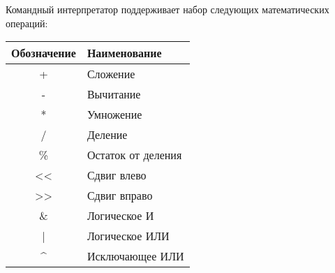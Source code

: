 Командный интерпретатор поддерживает набор следующих математических операций:

\begin{center}
	\begin{tabular}{c|l}
		\textbf{Обозначение} & \textbf{Наименование} \\
		\hline
		+ 	& 	Сложение \\
		\hline
		- 	& 	Вычитание \\
		\hline
		* 	& 	Умножение \\
		\hline
		/ 	& 	Деление \\
		\hline
		\% 	& 	Остаток от деления \\
		\hline
		<{<} 	& 	Сдвиг влево \\
		\hline
		>{>} 	& 	Сдвиг вправо \\
		\hline
		\& 	& 	Логическое И \\
		\hline
		| 	& 	Логическое ИЛИ \\
		\hline
		\textasciicircum 	& 	Исключающее ИЛИ
	\end{tabular}
\end{center}
